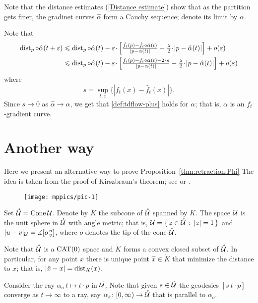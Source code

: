 \documentclass[oneside,a4paper, 12pt]{article}
\begin{document}
Note that the distance estimates (\ref{Distance estimate}) show that as the partition gets finer, the gradinet curves $\hat\alpha$ form a Cauchy sequence; denote its limit by $\alpha$.

Note that 
\begin{align*}
\dist_p\circ\hat\alpha(t+\eps)
&\le 
\dist_p\circ\hat\alpha(t)
-\eps\cdot \left[\tfrac{\hat f_t(p)-\hat f_t\circ\hat\alpha(t)}{|p-\alpha(t)|}-\tfrac\lambda2\cdot |p-\hat\alpha(t)|\right]
+o(\eps)
\\
&\le 
\dist_p\circ\hat\alpha(t)
-\eps\cdot \left[\tfrac{f_t(p)-f_t\circ\hat\alpha(t)-2\cdot s}{|p-\alpha(t)|}-\tfrac\lambda2\cdot |p-\hat\alpha(t)|\right]
+o(\eps)
\end{align*}
where 
\[s=\sup_{t,x} \{|f_t(x)-\hat f_t(x)|\}.\]
Since $s\to 0$ as $\hat\alpha\to \alpha$, we get that \ref{def:tdflow-plus} holds for $\alpha$;
that is, $\alpha$ is an $f_t$-gradient curve.
\qeds

\section{Another way}\label{Another way}

Here we present an alternative way to prove Proposition~\ref{thm:retraction:Phi}
The idea is taken from the proof of Kirszbraun's theorem; see \cite[5.1]{akp-kirszbraun} or \cite[9.4.1]{akp}. %

\begin{wrapfigure}{o}{55 mm}
\centering
\texttt{[image: mppics/pic-1]}
\end{wrapfigure}

Set $\mathring{\mathcal{U}}=\mathop{\rm Cone}\nolimits \mathcal{U}$.
Denote by $\mathring{K}$ the subcone of $\mathring{\mathcal{U}}$ spanned by $K$.
The space $\mathcal{U}$ is the unit sphere in $\mathring{\mathcal{U}}$ with angle metric;
that is, $\mathcal{U}=\{\,{z\in \mathring{\mathcal{U}}}\,:\,{|z|=1}\,\}$ and $|u-v|_{\mathcal{U}}=\measuredangle[o\,{}^u_v]$, where $o$ denotes the tip of the cone $\mathring{\mathcal{U}}$.

Note that $\mathring{\mathcal{U}}$ is a $\mathrm{CAT}(0)$ space and $\mathring{K}$ forms a convex closed subset of $\mathring{\mathcal{U}}$.
In particular, for any point $x$ there is unique point $\hat x\in \mathring{K}$
that minimize the distance to $x$;
that is, $|\hat x-x|=\mathop{\rm dist}\nolimits_K(x)$.

Consider the ray $\alpha_o\:t\mapsto t\cdot p$ in  $\mathring{\mathcal{U}}$.
Note that given $s\in \mathring{\mathcal{U}}$
the geodesics $[s\ t\cdot p]$ converge as $t\to\infty$ to a ray, 
say $\alpha_s\colon[0,\infty)\to \mathring{\mathcal{U}}$ that is parallel to $\alpha_o$.
\end{document}
